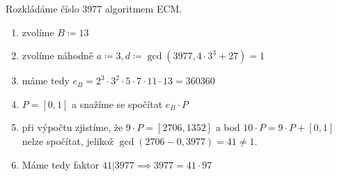 \documentclass[12pt, a4paper]{article}
\begin{document}
Rozkládáme číslo 3977 algoritmem ECM.
\begin{enumerate}
\item zvolíme $B \coloneqq 13$
\item zvolíme náhodně $a \coloneqq 3, d \coloneqq \gcd(3977, 4\cdot 3^3 + 27) = 1$
\item máme tedy $e_B = 2^3\cdot 3^2 \cdot 5 \cdot 7 \cdot 11 \cdot 13 = 360360$
\item $P = [0,1]$ a snažíme se spočítat $e_B \cdot P$
\item při výpočtu zjistíme, že $9\cdot P = [2706,1352]$ a bod $10 \cdot P = 9\cdot P + [0,1]$ nelze spočítat, jelikož $\gcd(2706-0,3977) = 41 \neq 1$.
\item Máme tedy faktor $41 | 3977 \implies 3977 = 41\cdot 97$
\end{enumerate}
\end{document}
